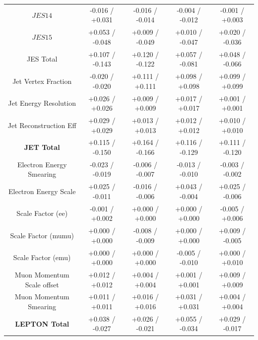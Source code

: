 \begin{table}[htbp]
\begin{center}
\begin{tabular}{|c|c|c|c|c|}
   $JES {14}$                          &  -0.016   / +0.031   & -0.016   / -0.014   & -0.004   / -0.012   & -0.001   / +0.003   \\
   $JES {15}$                          &  +0.053   / -0.048   & +0.009   / -0.049   & +0.010   / -0.047   & +0.020   / -0.036   \\
   \hline
   JES Total                             &  +0.107   / -0.143   & +0.120   / -0.122   & +0.057   / -0.081   & +0.048   / -0.066   \\
   Jet Vertex Fraction                   &  -0.020   / -0.020   & +0.111   / +0.111   & +0.098   / +0.098   & +0.099   / +0.099   \\
   Jet Energy Resolution                 &  +0.026   / +0.026   & +0.009   / +0.009   & +0.017   / +0.017   & +0.001   / +0.001   \\
   Jet Reconstruction Eff                &  +0.029   / +0.029   & +0.013   / +0.013   & +0.012   / +0.012   & +0.010   / +0.010   \\
   \hline
   \textbf{JET Total}                    &  +0.115   / -0.150   & +0.164   / -0.166   & +0.116   / -0.129   & +0.111   / -0.120   \\
   \hline
   Electron Energy Smearing              &  -0.023   / -0.019   & -0.006   / -0.007   & -0.013   / -0.010   & -0.003   / -0.002   \\
   Electron Energy Scale                 &  +0.025   / -0.011   & -0.016   / -0.006   & +0.043   / -0.004   & +0.025   / -0.006   \\
   Scale Factor (ee)                     &  -0.001   / +0.002   & +0.000   / +0.000   & +0.000   / +0.000   & -0.005   / +0.006   \\
   Scale Factor (mumu)                   &  +0.000   / +0.000   & -0.008   / -0.009   & +0.000   / +0.000   & +0.009   / -0.005   \\
   Scale Factor (emu)                    &  +0.000   / +0.000   & +0.000   / +0.000   & -0.005   / -0.010   & +0.000   / +0.010   \\
   Muon Momentum Scale offset            &  +0.012   / +0.012   & +0.004   / +0.004   & +0.001   / +0.001   & +0.009   / +0.009   \\
   Muon Momentum Smearing                &  +0.011   / +0.011   & +0.016   / +0.016   & +0.031   / +0.031   & +0.004   / +0.004   \\
   \hline
   \textbf{LEPTON Total}                 &  +0.038   / -0.027   & +0.026   / -0.021   & +0.055   / -0.034   & +0.029   / -0.017   \\

\end{tabular}
\end{center}
\end{table}

